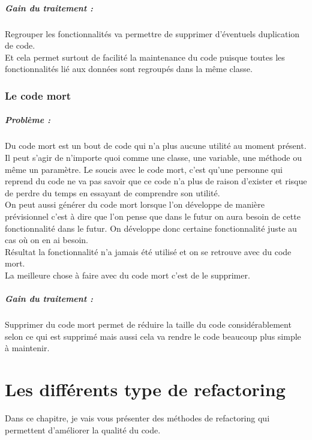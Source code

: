 \documentclass[a4paper,twoside,12pt,openright]{report}
\begin{document}
\paragraph{Gain du traitement :}
Regrouper les fonctionnalités va permettre de supprimer d'éventuels  duplication de code.\\
Et cela permet surtout de facilité la maintenance du code puisque toutes les fonctionnalités lié aux données sont regroupés dans la même classe.\\

\subsection{Le code mort}
\paragraph{Problème :}
Du code mort est un bout de code qui n'a plus aucune utilité au moment présent. Il peut s'agir de n'importe quoi comme une classe, une variable, une méthode ou même un paramètre.
Le soucis avec le code mort, c'est qu'une personne qui reprend du code ne va pas savoir que ce code n'a plus de raison d'exister et risque de perdre du temps en essayant de comprendre son utilité.\\

On peut aussi générer du code mort lorsque l'on développe de manière prévisionnel c'est à dire que l'on pense que dans le futur on aura besoin de cette fonctionnalité dans le futur.
On développe donc certaine fonctionnalité juste au cas où on en ai besoin.\\
Résultat la fonctionnalité n'a jamais été utilisé et on se retrouve avec du code mort.\\

La meilleure chose à faire avec du code mort c'est de le supprimer.\\

\paragraph{Gain du traitement :}
Supprimer du code mort permet de réduire la taille du code considérablement selon ce qui est supprimé mais aussi cela va rendre le code beaucoup plus simple à maintenir.\\




\chapter{Les différents type de refactoring}
Dans ce chapitre, je vais vous présenter des méthodes de refactoring qui permettent d'améliorer la qualité du code.\\
\end{document}
